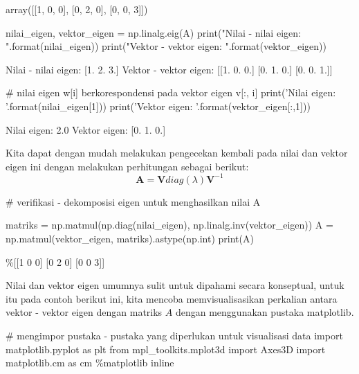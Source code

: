 \begin{pyout}
array([[1, 0, 0],
       [0, 2, 0],
       [0, 0, 3]])
\end{pyout}

\begin{pyin}
nilai_eigen, vektor_eigen = np.linalg.eig(A)
print("Nilai - nilai eigen: {}".format(nilai_eigen))
print("Vektor - vektor eigen: {}".format(vektor_eigen))
\end{pyin}

\begin{pyout}
Nilai - nilai eigen: [1. 2. 3.]
Vektor - vektor eigen: [[1. 0. 0.]
 [0. 1. 0.]
 [0. 0. 1.]]
\end{pyout}

\begin{pyin}
# nilai eigen w[i] berkorespondensi pada vektor eigen v[:, i]
print('Nilai eigen: {}'.format(nilai_eigen[1]))
print('Vektor eigen: {}'.format(vektor_eigen[:,1]))
\end{pyin}

\begin{pyout}
Nilai eigen: 2.0
Vektor eigen: [0. 1. 0.]
\end{pyout}

Kita dapat dengan mudah melakukan pengecekan kembali pada nilai dan vektor eigen ini dengan melakukan perhitungan sebagai berikut:
 $$\textbf{A} = \textbf{V}diag(\lambda)\textbf{V}^{-1}$$
\begin{pyin}
# verifikasi - dekomposisi eigen untuk menghasilkan nilai A

matriks = np.matmul(np.diag(nilai_eigen), np.linalg.inv(vektor_eigen))
A = np.matmul(vektor_eigen, matriks).astype(np.int)
print(A)
\end{pyin}

\begin{pyout}
\%[[1 0 0]
 [0 2 0]
 [0 0 3]]
\end{pyout}

Nilai dan vektor eigen umumnya sulit untuk dipahami secara konseptual, untuk itu pada contoh berikut ini, kita mencoba memvisualisasikan perkalian antara vektor - vektor eigen dengan matriks $A$ dengan menggunakan pustaka matplotlib.

\begin{pyin}
# mengimpor pustaka - pustaka yang diperlukan untuk visualisasi data
import matplotlib.pyplot as plt
from mpl_toolkits.mplot3d import Axes3D
import matplotlib.cm as cm
\%matplotlib inline
\end{pyin}

